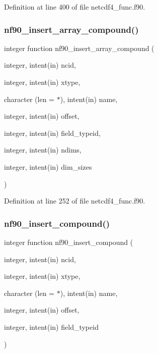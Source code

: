 Definition at line 400 of file netcdf4\+\_\+func.\+f90.

\mbox{\label{netcdf4__func_8f90_ae8759e28f6853cbc7a0d13ed690e3177}} 
\subsubsection{\texorpdfstring{nf90\+\_\+insert\+\_\+array\+\_\+compound()}{nf90\_insert\_array\_compound()}}
{\footnotesize\ttfamily integer function nf90\+\_\+insert\+\_\+array\+\_\+compound (\begin{DoxyParamCaption}\item[{integer, intent(in)}]{ncid,  }\item[{integer, intent(in)}]{xtype,  }\item[{character (len = $\ast$), intent(in)}]{name,  }\item[{integer, intent(in)}]{offset,  }\item[{integer, intent(in)}]{field\+\_\+typeid,  }\item[{integer, intent(in)}]{ndims,  }\item[{integer, intent(in)}]{dim\+\_\+sizes }\end{DoxyParamCaption})}



Definition at line 252 of file netcdf4\+\_\+func.\+f90.

\mbox{\label{netcdf4__func_8f90_a13e3b98b17ffbd4daac7142f28b240ad}} 
\subsubsection{\texorpdfstring{nf90\+\_\+insert\+\_\+compound()}{nf90\_insert\_compound()}}
{\footnotesize\ttfamily integer function nf90\+\_\+insert\+\_\+compound (\begin{DoxyParamCaption}\item[{integer, intent(in)}]{ncid,  }\item[{integer, intent(in)}]{xtype,  }\item[{character (len = $\ast$), intent(in)}]{name,  }\item[{integer, intent(in)}]{offset,  }\item[{integer, intent(in)}]{field\+\_\+typeid }\end{DoxyParamCaption})}



